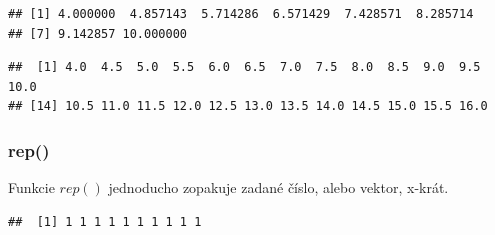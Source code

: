 \begin{verbatim}
## [1] 4.000000  4.857143  5.714286  6.571429  7.428571  8.285714
## [7] 9.142857 10.000000
\end{verbatim}

\newline

\begin{Shaded}
\begin{Highlighting}[]
\NormalTok{(} \NormalTok{, } \NormalTok{, } \NormalTok{)}
\end{Highlighting}
\end{Shaded}

\begin{verbatim}
##  [1] 4.0  4.5  5.0  5.5  6.0  6.5  7.0  7.5  8.0  8.5  9.0  9.5 10.0 
## [14] 10.5 11.0 11.5 12.0 12.5 13.0 13.5 14.0 14.5 15.0 15.5 16.0
\end{verbatim}

\hypertarget{rep}{%
\subsubsection{rep()}\label{rep}}

Funkcie \(rep()\) jednoducho zopakuje zadané číslo, alebo vektor,
x-krát.

\begin{Shaded}
\begin{Highlighting}[]
\NormalTok{(} \NormalTok{, } \NormalTok{)}
\end{Highlighting}
\end{Shaded}

\begin{verbatim}
##  [1] 1 1 1 1 1 1 1 1 1 1
\end{verbatim}

\begin{Shaded}
\begin{Highlighting}[]
\NormalTok{(} \NormalTok{(}\NormalTok{, }\NormalTok{, }\NormalTok{), } \NormalTok{)}
\end{Highlighting}
\end{Shaded}

